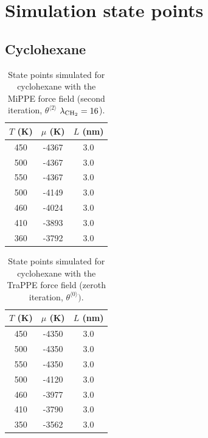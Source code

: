 \documentclass[journal=jctc,manuscript=article]{achemso}
\begin{document}
\newpage
\clearpage

\section{Simulation state points} \label{SI sec: State Points}

\subsection{Cyclohexane}

\begin{table}[htb!]
	\caption{State points simulated for cyclohexane with the MiPPE force field (second iteration, $\theta^{\langle2\rangle}$ $\lambda_{\rm CH_2} = 16$).}
	\begin{center}
		\begin{tabular}{|c|c|c|}
			\hline
			$T$ (K) & $\mu$ (K) & $L$ (nm) \\ \hline
			450	&	-4367	&	3.0	\\
			500	&	-4367	&	3.0	\\
			550	&	-4367	&	3.0	\\
			500	&	-4149	&	3.0	\\
			460	&	-4024	&	3.0	\\
			410	&	-3893	&	3.0	\\
			360	&	-3792	&	3.0	\\
			\hline
		\end{tabular}
	\end{center}
\end{table}


\begin{table}[htb!]
	\caption{State points simulated for cyclohexane with the TraPPE force field (zeroth iteration, $\theta^{\langle0\rangle})$.}
	\begin{center}
		\begin{tabular}{|c|c|c|}
			\hline
			$T$ (K) & $\mu$ (K) & $L$ (nm) \\ \hline
			450	&	-4350	&	3.0	\\
			500	&	-4350	&	3.0	\\
			550	&	-4350	&	3.0	\\
			500	&	-4120	&	3.0	\\
			460	&	-3977	&	3.0	\\
			410	&	-3790	&	3.0	\\
			350	&	-3562	&	3.0	\\
			\hline
		\end{tabular}
	\end{center}
\end{table}
\end{document}
